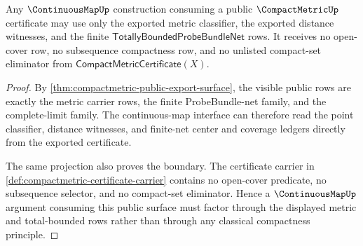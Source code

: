 \begin{theorem}
\label{thm:compactmetric-continuousmap-consumption-boundary}
Any $\ContinuousMapUp$ construction consuming a public
$\CompactMetricUp$ certificate may use only the exported metric classifier,
the exported distance witnesses, and the finite
$\mathsf{TotallyBoundedProbeBundleNet}$ rows. It receives no open-cover row,
no subsequence compactness row, and no unlisted compact-set eliminator from
$\mathsf{CompactMetricCertificate}(X)$.
\end{theorem}
\begin{proof}
By \autoref{thm:compactmetric-public-export-surface}, the visible public
rows are exactly the metric carrier rows, the finite ProbeBundle-net family,
and the complete-limit family. The continuous-map interface can therefore
read the point classifier, distance witnesses, and finite-net center and
coverage ledgers directly from the exported certificate.

The same projection also proves the boundary. The certificate carrier in
\autoref{def:compactmetric-certificate-carrier} contains no open-cover
predicate, no subsequence selector, and no compact-set eliminator. Hence a
$\ContinuousMapUp$ argument consuming this public surface must factor through
the displayed metric and total-bounded rows rather than through any classical
compactness principle.
\end{proof}

